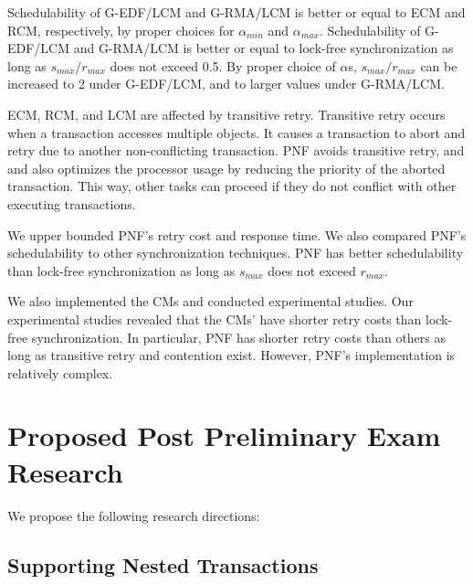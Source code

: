 \documentclass[12pt,english]{report}
\begin{document}
Schedulability of G-EDF/LCM and G-RMA/LCM is better or equal to ECM and RCM, respectively, by proper choices for $\alpha_{min}$ and $\alpha_{max}$. Schedulability of G-EDF/LCM and G-RMA/LCM is better or equal to lock-free synchronization as long as $s_{max}/r_{max}$ does not exceed 0.5. By proper choice of $\alpha$s, $s_{max}/r_{max}$ can be increased to 2 under G-EDF/LCM, and to larger values under G-RMA/LCM.

ECM, RCM, and LCM are affected by transitive retry. Transitive retry occurs when a transaction accesses multiple objects. It causes a transaction to abort and retry  due to another non-conflicting transaction. PNF avoids transitive retry, and and also optimizes the processor usage by reducing the priority of the aborted transaction. This way, other tasks can proceed if they do not conflict with other executing transactions. 

We upper bounded PNF's retry cost and response time. We also compared PNF's schedulability to other synchronization techniques. PNF has better schedulability than lock-free synchronization as long as $s_{max}$ does not exceed $r_{max}$. 

We also implemented the CMs and conducted experimental studies. Our experimental studies revealed that the CMs' have shorter retry costs than lock-free synchronization. In particular, PNF has shorter retry costs than others as long as transitive retry and contention exist. However, PNF's implementation is relatively complex. 



\section{Proposed Post Preliminary Exam Research}

We propose the following research directions:

\subsection{Supporting Nested Transactions} 
\end{document}
